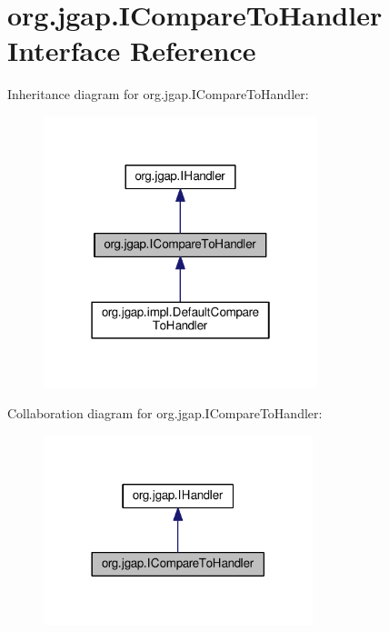 \hypertarget{interfaceorg_1_1jgap_1_1_i_compare_to_handler}{\section{org.\-jgap.\-I\-Compare\-To\-Handler Interface Reference}
\label{interfaceorg_1_1jgap_1_1_i_compare_to_handler}
}


Inheritance diagram for org.\-jgap.\-I\-Compare\-To\-Handler\-:
\nopagebreak
\begin{figure}[H]
\begin{center}
\leavevmode
\includegraphics[width=226pt]{interfaceorg_1_1jgap_1_1_i_compare_to_handler__inherit__graph}
\end{center}
\end{figure}


Collaboration diagram for org.\-jgap.\-I\-Compare\-To\-Handler\-:
\nopagebreak
\begin{figure}[H]
\begin{center}
\leavevmode
\includegraphics[width=222pt]{interfaceorg_1_1jgap_1_1_i_compare_to_handler__coll__graph}
\end{center}
\end{figure}
